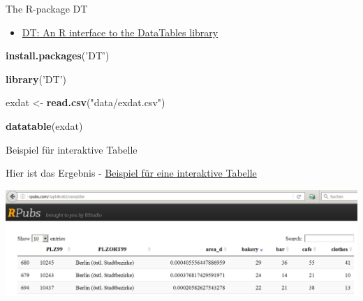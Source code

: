 \documentclass[ignorenonframetext,]{beamer}
\newenvironment{Shaded}{}{}
\newcommand{\KeywordTok}[1]{\textcolor[rgb]{0.00,0.44,0.13}{\textbf{{#1}}}}
\newcommand{\StringTok}[1]{\textcolor[rgb]{0.25,0.44,0.63}{{#1}}}
\newcommand{\NormalTok}[1]{{#1}}
\providecommand{\tightlist}{%
\setlength{\itemsep}{0pt}\setlength{\parskip}{0pt}}
\begin{document}
\begin{frame}[fragile]{The R-package DT}

\begin{itemize}
\tightlist
\item
  \href{https://rstudio.github.io/DT/}{DT: An R interface to the
  DataTables library}
\end{itemize}

\begin{Shaded}
\begin{Highlighting}[]
\KeywordTok{install.packages}\NormalTok{(}\StringTok{'DT'}\NormalTok{)}
\end{Highlighting}
\end{Shaded}

\begin{Shaded}
\begin{Highlighting}[]
\KeywordTok{library}\NormalTok{(}\StringTok{'DT'}\NormalTok{)}
\end{Highlighting}
\end{Shaded}

\begin{Shaded}
\begin{Highlighting}[]
\NormalTok{exdat <-}\StringTok{ }\KeywordTok{read.csv}\NormalTok{(}\StringTok{"data/exdat.csv"}\NormalTok{)}
\end{Highlighting}
\end{Shaded}

\begin{Shaded}
\begin{Highlighting}[]
\KeywordTok{datatable}\NormalTok{(exdat)}
\end{Highlighting}
\end{Shaded}

\end{frame}

\begin{frame}{Beispiel für interaktive Tabelle}

Hier ist das Ergebnis -
\href{http://rpubs.com/Japhilko82/osmplzbe}{Beispiel für eine
interaktive Tabelle}

\includegraphics{./tex2pdf.956/b7341e8913c14104084c904e440712bccda8197d.png}

\end{frame}
\end{document}
